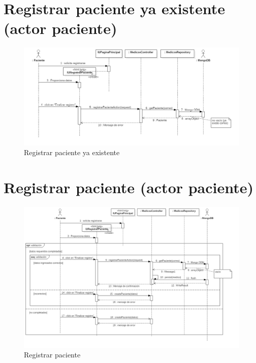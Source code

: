 \section{Registrar paciente ya existente (actor paciente)}
\begin{figure}[htbp!]
	\centering
	\includegraphics[width=1\textwidth]{uml/DiagramasSecuencia/DavidPacheco/registrarse-paciente-correo-ya-existe}
	\caption{Registrar paciente ya existente}
\end{figure}
\newpage
\section{Registrar paciente (actor paciente)}
\begin{figure}[htbp!]
	\centering
	\includegraphics[width=1\textwidth]{uml/DiagramasSecuencia/DavidPacheco/registrarse-paciente}
	\caption{Registrar paciente}
\end{figure}
\newpage
